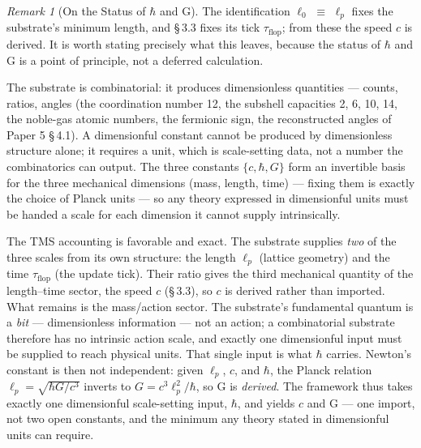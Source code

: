 \documentclass[11pt,oneside]{report}
\theoremstyle{definition}
\theoremstyle{remark}
\newtheorem{remark}[theorem]{Remark}
\begin{document}
\begin{remark}[On the Status of \ensuremath{\hbar} and G]
The identification \ensuremath{\ell_{0}} \ensuremath{\equiv} \ensuremath{\ell_{p}} fixes the substrate's minimum length,
and \S\,3.3 fixes its tick \ensuremath{\tau_{\mathrm{flop}}}; from these the speed \ensuremath{c} is
derived. It is worth stating precisely what this leaves, because the status of
\ensuremath{\hbar} and G is a point of principle, not a deferred calculation.

The substrate is combinatorial: it produces dimensionless quantities --- counts,
ratios, angles (the coordination number 12, the subshell capacities 2, 6, 10, 14,
the noble-gas atomic numbers, the fermionic sign, the reconstructed angles of
Paper 5 \S\,4.1). A dimensionful constant cannot be produced by dimensionless
structure alone; it requires a unit, which is scale-setting data, not a number the
combinatorics can output. The three constants \ensuremath{\{c, \hbar, G\}} form an invertible
basis for the three mechanical dimensions (mass, length, time) --- fixing them is
exactly the choice of Planck units --- so any theory expressed in dimensionful
units must be handed a scale for each dimension it cannot supply intrinsically.

The TMS accounting is favorable and exact. The substrate supplies \emph{two} of
the three scales from its own structure: the length \ensuremath{\ell_{p}} (lattice geometry)
and the time \ensuremath{\tau_{\mathrm{flop}}} (the update tick). Their ratio gives the third
mechanical quantity of the length--time sector, the speed \ensuremath{c} (\S\,3.3), so \ensuremath{c}
is derived rather than imported. What remains is the mass/action sector. The
substrate's fundamental quantum is a \emph{bit} --- dimensionless information ---
not an action; a combinatorial substrate therefore has no intrinsic action scale,
and exactly one dimensionful input must be supplied to reach physical units. That
single input is what \ensuremath{\hbar} carries. Newton's constant is then not independent:
given \ensuremath{\ell_{p}}, \ensuremath{c}, and \ensuremath{\hbar}, the Planck relation
\ensuremath{\ell_{p} = \sqrt{\hbar G/c^{3}}} inverts to \ensuremath{G = c^{3}\ell_{p}^{2}/\hbar}, so G is
\emph{derived}. The framework thus takes exactly one dimensionful scale-setting
input, \ensuremath{\hbar}, and yields \ensuremath{c} and G --- one import, not two open constants, and
the minimum any theory stated in dimensionful units can require.


\end{remark}
\end{document}
